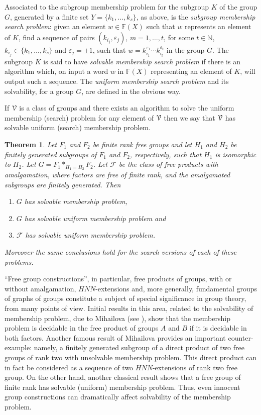\documentclass[a4paper,12pt]{article}
\newcommand{\e}{\varepsilon }
\newcommand{\cF}{{\cal{F}}}
\newcommand{\cV}{{\cal{V}}}
\newtheorem{theorem}{Theorem}[section]
\numberwithin{equation}{section}
\numberwithin{figure}{section}
\newcommand{\NN}{\ensuremath{\mathbb{N}}}
\newcommand{\FF}{\ensuremath{\mathbb{F}}}
\renewcommand{\cF}{\mathcal{F}}
\newcommand{\be}{\begin{enumerate}}
\newcommand{\ee}{\end{enumerate}}
\begin{document}
Associated to the subgroup membership problem for the subgroup $K$ of the group $G$,
generated by a finite set $Y=\{k_1,\ldots, k_s\}$, as
above, is the \emph{subgroup membership search problem}: 
given an element $w\in \FF(X)$ such
that $w$ represents an element of $K$, find a sequence of pairs 
$(k_{i_j},\e_j)$, $m=1,\ldots ,t$, for some $t\in \NN$, $k_{i_j}\in \{k_1,\ldots, k_s\}$
and $\e_j=\pm 1$,  such that 
$w=k_{i_1}^{\e_1}\cdots k_{i_t}^{\e_t}$ in the group $G$.  The subgroup $K$ 
is said to have
\emph{solvable  membership search problem} if there is an algorithm which, on input 
a word $w$ in $\FF(X)$ representing an element of $K$, will output such
 a sequence. The  \emph{uniform membership search problem} and 
its solvability, 
for a group $G$, are 
defined
in the obvious way.


If $\cV$ is a class of groups and there exists an algorithm to
solve the uniform membership (search) problem for any element of $\cV$ then
we say that $\cV$ has solvable uniform  (search) membership problem. 

\begin{theorem}\label{thm:membership}
Let $F_1$ and $F_2$ be finite rank free groups and let $H_1$ and $H_2$
be finitely generated subgroups of $F_1$ and $F_2$, respectively, such
that $H_1$ is isomorphic to $H_2$. Let $G=F_1 \ast_{H_1=H_2} F_2$. 
Let $\cF$ be the class of free products with amalgamation, where
factors are free of finite rank, and the amalgamated subgroups are
finitely generated. 
Then
\be
\item\label{it:membership}
$G$ has solvable membership problem, 
\item \label{it:uni-membership}
$G$ has solvable uniform  membership problem and 
\item\label{it:class-uni-membership}
$\cF$ has solvable uniform  membership problem.
\ee
Moreover the same conclusions hold for the search versions of each of these
problems. 
\end{theorem}


``Free group constructions'', in particular, free products of groups,
with or without amalgamation, $HNN$-extensions
 and, more generally, fundamental groups
of graphs of groups constitute a subject of special significance in
group theory, from many points of view. Initial results in this area,
related to the solvability of membership problem,  due to Mihailova (see
\cite{mi59,mi68}), show that the membership problem is
decidable in the free product of groups $A$ and $B$ if it is decidable
in both factors. Another famous result of
Mihailova \cite{mi58}  provides an important counter-example:
 namely,  a finitely generated
subgroup of a direct product of two free groups of rank two with
unsolvable membership problem.  This direct
product can in fact be considered as a sequence of two $HNN$-extensions
of rank two free group. On the other hand, another classical
result \cite[Proposition 2.21]{LS} shows that a free group of finite rank has 
solvable (uniform)
membership problem. Thus,  even innocent group
constructions can dramatically affect solvability of the membership problem.
\end{document}
